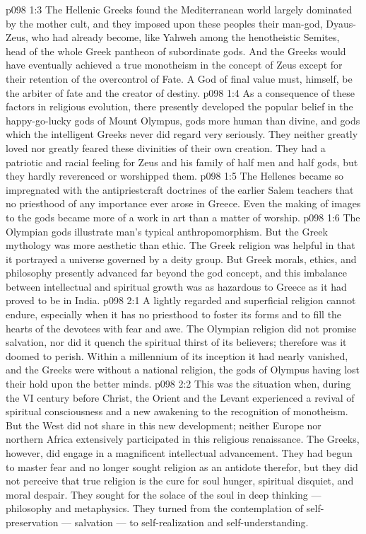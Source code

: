 \vs p098 1:3 The Hellenic Greeks found the Mediterranean world largely dominated by the mother cult, and they imposed upon these peoples their man\hyp{}god, Dyaus\hyp{}Zeus, who had already become, like Yahweh among the henotheistic Semites, head of the whole Greek pantheon of subordinate gods. And the Greeks would have eventually achieved a true monotheism in the concept of Zeus except for their retention of the overcontrol of Fate. A God of final value must, himself, be the arbiter of fate and the creator of destiny.
\vs p098 1:4 As a consequence of these factors in religious evolution, there presently developed the popular belief in the happy\hyp{}go\hyp{}lucky gods of Mount Olympus, gods more human than divine, and gods which the intelligent Greeks never did regard very seriously. They neither greatly loved nor greatly feared these divinities of their own creation. They had a patriotic and racial feeling for Zeus and his family of half men and half gods, but they hardly reverenced or worshipped them.
\vs p098 1:5 The Hellenes became so impregnated with the antipriestcraft doctrines of the earlier Salem teachers that no priesthood of any importance ever arose in Greece. Even the making of images to the gods became more of a work in art than a matter of worship.
\vs p098 1:6 The Olympian gods illustrate man’s typical anthropomorphism. But the Greek mythology was more aesthetic than ethic. The Greek religion was helpful in that it portrayed a universe governed by a deity group. But Greek morals, ethics, and philosophy presently advanced far beyond the god concept, and this imbalance between intellectual and spiritual growth was as hazardous to Greece as it had proved to be in India.
\vs p098 2:1 A lightly regarded and superficial religion cannot endure, especially when it has no priesthood to foster its forms and to fill the hearts of the devotees with fear and awe. The Olympian religion did not promise salvation, nor did it quench the spiritual thirst of its believers; therefore was it doomed to perish. Within a millennium of its inception it had nearly vanished, and the Greeks were without a national religion, the gods of Olympus having lost their hold upon the better minds.
\vs p098 2:2 This was the situation when, during the VI century before Christ, the Orient and the Levant experienced a revival of spiritual consciousness and a new awakening to the recognition of monotheism. But the West did not share in this new development; neither Europe nor northern Africa extensively participated in this religious renaissance. The Greeks, however, did engage in a magnificent intellectual advancement. They had begun to master fear and no longer sought religion as an antidote therefor, but they did not perceive that true religion is the cure for soul hunger, spiritual disquiet, and moral despair. They sought for the solace of the soul in deep thinking --- philosophy and metaphysics. They turned from the contemplation of self\hyp{}preservation --- salvation --- to self\hyp{}realization and self\hyp{}understanding.

